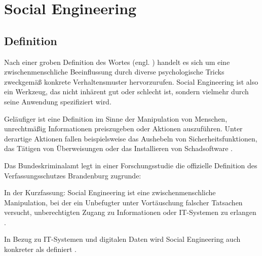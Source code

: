 \chapter{Social Engineering}
\label{chapter:se}

\section{Definition}

Nach einer groben Definition des Wortes  (engl. )
handelt es sich um eine zwischenmenschliche Beeinflussung durch diverse psychologische
Tricks zweckgemäß konkrete Verhaltensmuster hervorzurufen.
Social Engineering ist also ein Werkzeug, das nicht inhärent gut oder schlecht ist, sondern vielmehr durch seine Anwendung spezifiziert wird.


Geläufiger ist eine Definition im Sinne der Manipulation von Menschen, unrechtmäßig Informationen preiszugeben oder Aktionen auszuführen.
Unter derartige Aktionen fallen beispielsweise das Aushebeln von Sicherheitsfunktionen, das Tätigen von Überweisungen oder
das Installieren von Schadsoftware .

Das Bundeskriminalamt legt in einer Forschungsstudie die offizielle Definition des Verfassungsschutzes Brandenburg
zugrunde: 

In der Kurzfassung: Social Engineering ist eine zwischenmenschliche Manipulation,
bei der ein Unbefugter unter Vortäuschung falscher Tatsachen versucht, unberechtigten Zugang zu Informationen oder IT-Systemen zu erlangen .

In Bezug zu IT-Systemen und digitalen Daten wird Social Engineering auch konkreter als  definiert .

